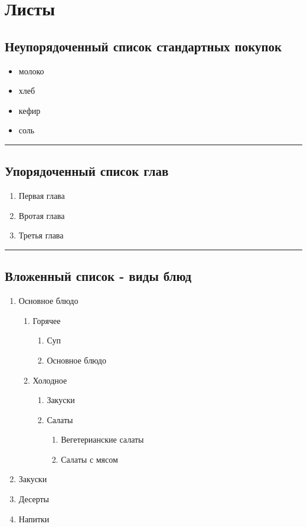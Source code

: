 \documentclass[10pt,a4paper]{report}
\begin{document}
\chapter{Листы}
\section{Неупорядоченный список стандартных покупок}
\begin{itemize}
	\item молоко 
	\item хлеб
	\item кефир
    \item соль
\end{itemize}

\noindent\rule{\textwidth}{1pt}

\section{Упорядоченный список глав}
\begin{enumerate}  
	\item Первая глава
	\item Вротая глава
	\item Третья глава
\end{enumerate}

\noindent\rule{\textwidth}{1pt}

\section{Вложенный список - виды блюд}
\begin{enumerate}
	\item Основное блюдо
	\begin{enumerate}
		\item Горячее
        \begin{enumerate}
            \item Суп
            \item Основное блюдо
        \end{enumerate}
		\item Холодное
		\begin{enumerate}
		\item Закуски
		\item Салаты
	    \begin{enumerate}
		\item Вегетерианские салаты
        \item Салаты с мясом

	\end{enumerate}
	\end{enumerate}
	\end{enumerate}
		\item Закуски
		\item Десерты 
        \item Напитки
\end{enumerate}
\clearpage
\end{document}
